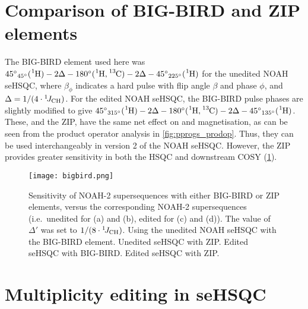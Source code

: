 \section{Comparison of BIG-BIRD and ZIP elements}

The BIG-BIRD element used here was ${45^\circ}_{45^\circ}(\proton{}) - 2\Delta - 180^\circ(\proton{},\carbon{}) - 2\Delta - {45^\circ}_{225^\circ}(\proton{})$ for the unedited NOAH seHSQC, where $\beta_\phi$ indicates a hard pulse with flip angle $\beta$ and phase $\phi$, and $\Delta = 1/(4\cdot\onejch)$.
For the edited NOAH seHSQC, the BIG-BIRD pulse phases are slightly modified to give ${45^\circ}_{315^\circ}(\proton{}) - 2\Delta - 180^\circ(\proton{},\carbon{}) - 2\Delta - {45^\circ}_{135^\circ}(\proton{})$.
These, and the ZIP, have the same net effect on  and  magnetisation, as can be seen from the product operator analysis in \cref{fig:pprogs_prodop}.
Thus, they can be used interchangeably in version 2 of the NOAH seHSQC.
However, the ZIP provides greater sensitivity in both the HSQC and downstream COSY (\cref{fig:bigbird}).

\begin{figure}
    \centering
    \texttt{[image: bigbird.png]}
    {\label{fig:bigbird_unedited_bigbird}}
    {\label{fig:bigbird_unedited_zip}}
    {\label{fig:bigbird_edited_bigbird}}
    {\label{fig:bigbird_edited_zip}}
    \caption{
        Sensitivity of NOAH-2  supersequences with either BIG-BIRD or ZIP elements, versus the corresponding NOAH-2  supersequences (i.e.\ unedited for (a) and (b), edited for (c) and (d)).
        The value of $\Delta'$ was set to $1/(8 \cdot \onejch)$.
        \textbf{} Using the unedited NOAH seHSQC with the BIG-BIRD element.
        \textbf{} Unedited seHSQC with ZIP.
        \textbf{} Edited seHSQC with BIG-BIRD.
        \textbf{} Edited seHSQC with ZIP.
        \andro{}
    }
    \label{fig:bigbird}
\end{figure}


\section{Multiplicity editing in seHSQC}

